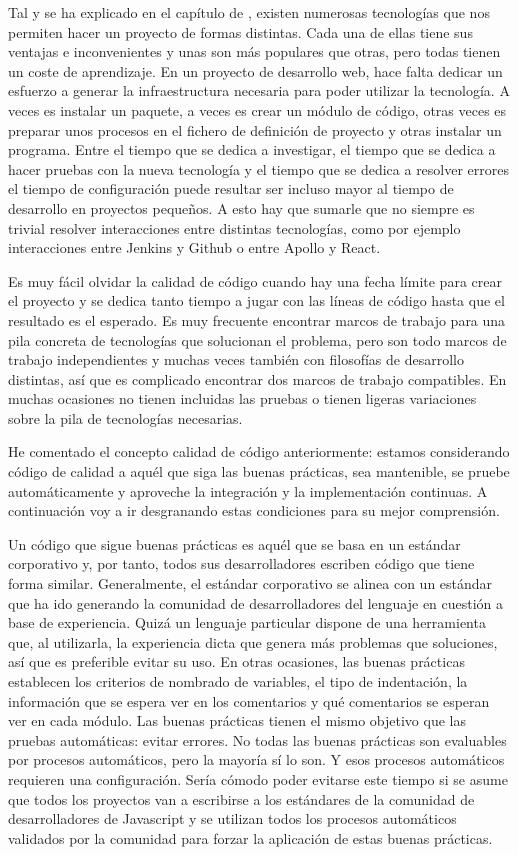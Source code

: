 Tal y se ha explicado en el capítulo de , existen numerosas tecnologías que nos permiten hacer un proyecto de formas distintas. Cada una de ellas tiene sus ventajas e inconvenientes y unas son más populares que otras, pero todas tienen un coste de aprendizaje. En un proyecto de desarrollo web, hace falta dedicar un esfuerzo a generar la infraestructura necesaria para poder utilizar la tecnología. A veces es instalar un paquete, a veces es crear un módulo de código, otras veces es preparar unos procesos en el fichero de definición de proyecto y otras instalar un programa. Entre el tiempo que se dedica a investigar, el tiempo que se dedica a hacer pruebas con la nueva tecnología y el tiempo que se dedica a resolver errores el tiempo de configuración puede resultar ser incluso mayor al tiempo de desarrollo en proyectos pequeños. A esto hay que sumarle que no siempre es trivial resolver interacciones entre distintas tecnologías, como por ejemplo interacciones entre Jenkins y Github o entre Apollo y React.

Es muy fácil olvidar la calidad de código cuando hay una fecha límite para crear el proyecto y se dedica tanto tiempo a jugar con las líneas de código hasta que el resultado es el esperado. Es muy frecuente encontrar marcos de trabajo para una pila concreta de tecnologías que solucionan el problema, pero son todo marcos de trabajo independientes y muchas veces también con filosofías de desarrollo distintas, así que es complicado encontrar dos marcos de trabajo compatibles. En muchas ocasiones no tienen incluidas las pruebas o tienen ligeras variaciones sobre la pila de tecnologías necesarias.

He comentado el concepto calidad de código anteriormente: estamos considerando código de calidad a aquél que siga las buenas prácticas, sea mantenible, se pruebe automáticamente y aproveche la integración y la implementación continuas. A continuación voy a ir desgranando estas condiciones para su mejor comprensión.

Un código que sigue buenas prácticas es aquél que se basa en un estándar corporativo y, por tanto, todos sus desarrolladores escriben código que tiene forma similar. Generalmente, el estándar corporativo se alinea con un estándar que ha ido generando la comunidad de desarrolladores del lenguaje en cuestión a base de experiencia. Quizá un lenguaje particular dispone de una herramienta que, al utilizarla, la experiencia dicta que genera más problemas que soluciones, así que es preferible evitar su uso. En otras ocasiones, las buenas prácticas establecen los criterios de nombrado de variables, el tipo de indentación, la información que se espera ver en los comentarios y qué comentarios se esperan ver en cada módulo. Las buenas prácticas tienen el mismo objetivo que las pruebas automáticas: evitar errores. No todas las buenas prácticas son evaluables por procesos automáticos, pero la mayoría sí lo son. Y esos procesos automáticos requieren una configuración. Sería cómodo poder evitarse este tiempo si se asume que todos los proyectos van a escribirse a los estándares de la comunidad de desarrolladores de Javascript y se utilizan todos los procesos automáticos validados por la comunidad para forzar la aplicación de estas buenas prácticas.

